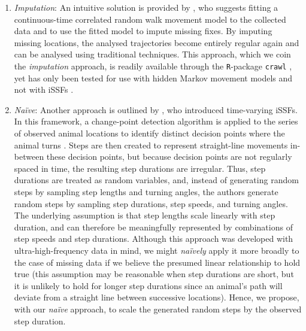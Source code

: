 \documentclass[abstract=on,10pt,a4paper,bibliography=totocnumbered]{article}
\begin{document}
\begin{enumerate}

  \item \textit{Imputation}: An intuitive solution is provided by
  \citet{McClintock.2017}, who suggests fitting a continuous-time correlated
  random walk movement model \citep{Johnson.2008} to the collected data and to
  use the fitted model to impute missing fixes. By imputing missing locations,
  the analysed trajectories become entirely regular again and can be analysed
  using traditional techniques. This approach, which we coin the
  \textit{imputation} approach, is readily available through the
  \texttt{R}-package \texttt{crawl} \citep{Johnson.2022}, yet has only been
  tested for use with hidden Markov movement models and not with iSSFs
  \citep{McClintock.2017}.

  \item \textit{Na\"ive}: Another approach is outlined by \citet{Munden.2021},
  who introduced time-varying iSSFs. In this framework, a change-point detection
  algorithm is applied to the series of observed animal locations to identify
  distinct decision points where the animal turns \citep{Potts.2018,
  Munden.2021}. Steps are then created to represent straight-line movements
  in-between these decision points, but because decision points are not
  regularly spaced in time, the resulting step durations are irregular. Thus,
  step durations are treated as random variables, and, instead of generating
  random steps by sampling step lengths and turning angles, the authors generate
  random steps by sampling step durations, step speeds, and turning angles. The
  underlying assumption is that step lengths scale linearly with step duration,
  and can therefore be meaningfully represented by combinations of step speeds
  and step durations. Although this approach was developed with
  ultra-high-frequency data in mind, we might \textit{na\"ively} apply it more
  broadly to the case of missing data if we believe the presumed
  linear relationship to hold true (this assumption may be reasonable when
  step durations are short, but it is unlikely to hold for longer step durations
  since an animal's path will deviate from a straight line between successive
  locations). Hence, we propose, with our \textit{na\"ive} approach, to scale the
  generated random steps by the observed step duration.


\end{enumerate}
\end{document}
